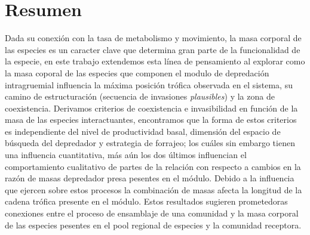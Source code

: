\section{Resumen}
Dada su conexi\'on con la tasa de metabolismo y movimiento, la masa corporal de las especies es un caracter clave que determina gran parte de la funcionalidad de la especie, en este trabajo extendemos esta l\'inea de pensamiento al explorar como la masa coporal de las especies que componen el modulo de depredaci\'on intragruemial influencia la m\'axima posici\'on tr\'ofica observada en el sistema, su camino de estructuraci\'on (secuencia de invasiones \emph{plausibles}) y la zona de coexistencia. Derivamos criterios de coexistencia e invasibilidad en funci\'on de la masa de las especies interactuantes, encontramos que la forma de estos criterios es independiente del nivel de productividad basal, dimensi\'on del espacio de b\'usqueda del depredador y estrategia de forrajeo; los cu\'ales sin embargo tienen una influencia cuantitativa, m\'as a\'un los dos \'ultimos influencian el comportamiento cualitativo de partes de la relaci\'on con respecto a cambios en la raz\'on de masas depredador presa pesentes en el m\'odulo. Debido a la influencia que ejercen sobre estos procesos la combinaci\'on de masas afecta la longitud de la cadena tr\'ofica presente en el m\'odulo. Estos resultados sugieren prometedoras conexiones entre el proceso de ensamblaje de una comunidad y la masa corporal de las especies pesentes en el pool regional de especies y la comunidad receptora.


